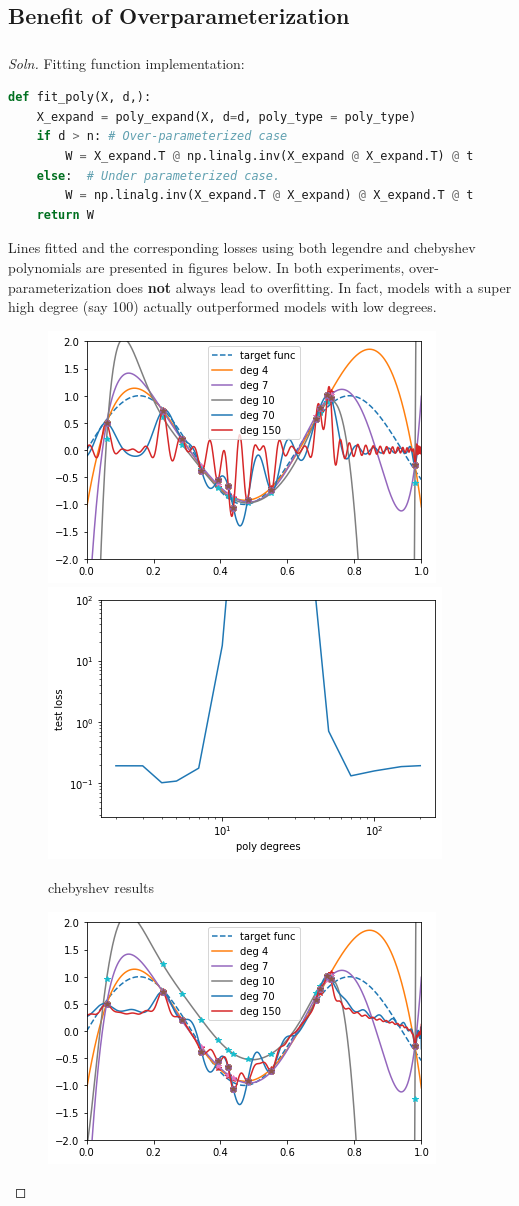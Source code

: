 \documentclass{article}
\begin{document}
	\subsection{Benefit of Overparameterization}
	\subsubsection{}
	\begin{proof}[Soln]
	Fitting function implementation:
	\begin{lstlisting}[language=Python]
def fit_poly(X, d,):
    X_expand = poly_expand(X, d=d, poly_type = poly_type)
    if d > n: # Over-parameterized case
        W = X_expand.T @ np.linalg.inv(X_expand @ X_expand.T) @ t
    else:  # Under parameterized case.
        W = np.linalg.inv(X_expand.T @ X_expand) @ X_expand.T @ t
    return W
	\end{lstlisting}
	Lines fitted and the corresponding losses using both legendre and chebyshev polynomials are presented in figures below. In both experiments, over-parameterization does \textbf{not} always lead to overfitting. In fact, models with a super high degree (say 100) actually outperformed models with low degrees.
		\begin{figure}[H]
			\center
			\includegraphics[width=0.45\linewidth]{chebyshev_fit.png}
			\includegraphics[width=0.45\linewidth]{chebyshev_loss.png}
			\caption{chebyshev results}
		\end{figure}
		\begin{figure}[H]
			\center
			\includegraphics[width=0.45\linewidth]{legendre_fit.png}

\end{figure}
\end{proof}
\end{document}
